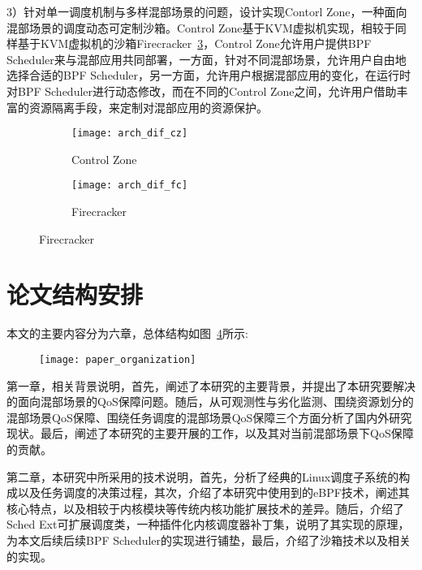 3）针对单一调度机制与多样混部场景的问题，设计实现Contorl Zone，一种面向混部场景的调度动态可定制沙箱。Control Zone基于KVM虚拟机实现，相较于同样基于KVM虚拟机的沙箱Firecracker~\ref{fig:arch_dif}，Control Zone允许用户提供BPF Scheduler来与混部应用共同部署，一方面，针对不同混部场景，允许用户自由地选择合适的BPF Scheduler，另一方面，允许用户根据混部应用的变化，在运行时对BPF Scheduler进行动态修改，而在不同的Control Zone之间，允许用户借助丰富的资源隔离手段，来定制对混部应用的资源保护。

\begin{figure}[!htbp]
    \centering
    \begin{subfigure}[b]{0.45\textwidth}
        \texttt{[image: arch\_dif\_cz]}
        \caption{Control Zone}
        \label{fig:arch_dif_cz}
    \end{subfigure}
    \hfill
    \begin{subfigure}[b]{0.45\textwidth}
        \texttt{[image: arch\_dif\_fc]}
        \caption{Firecracker}
        \label{fig:arch_dif_fc}
    \end{subfigure}
\label{fig:arch_dif}
\end{figure}

\section{论文结构安排}

本文的主要内容分为六章，总体结构如图~\ref{fig:paper_organization}所示:

\begin{figure}[!htbp]
    \centering
    \texttt{[image: paper\_organization]}
    \label{fig:paper_organization}
\end{figure}

第一章，相关背景说明，首先，阐述了本研究的主要背景，并提出了本研究要解决的面向混部场景的QoS保障问题。随后，从可观测性与劣化监测、围绕资源划分的混部场景QoS保障、围绕任务调度的混部场景QoS保障三个方面分析了国内外研究现状。最后，阐述了本研究的主要开展的工作，以及其对当前混部场景下QoS保障的贡献。

第二章，本研究中所采用的技术说明，首先，分析了经典的Linux调度子系统的构成以及任务调度的决策过程，其次，介绍了本研究中使用到的eBPF技术，阐述其核心特点，以及相较于内核模块等传统内核功能扩展技术的差异。随后，介绍了Sched Ext可扩展调度类，一种插件化内核调度器补丁集，说明了其实现的原理，为本文后续后续BPF Scheduler的实现进行铺垫，最后，介绍了沙箱技术以及相关的实现。

